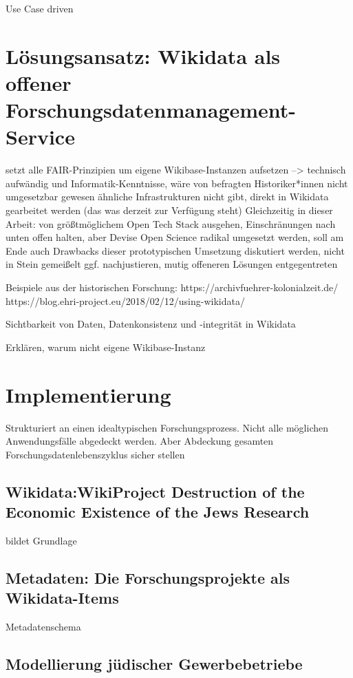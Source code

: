 \onehalfspacing

Use Case driven

\section{Lösungsansatz: Wikidata als offener Forschungsdatenmanagement-Service}

setzt alle FAIR-Prinzipien um
eigene Wikibase-Instanzen aufsetzen --> technisch aufwändig und Informatik-Kenntnisse, wäre von befragten Historiker*innen nicht umgesetzbar gewesen
ähnliche Infrastrukturen nicht gibt, direkt in Wikidata gearbeitet werden (das was derzeit zur Verfügung steht)
Gleichzeitig in dieser Arbeit: von größtmöglichem Open Tech Stack ausgehen, Einschränungen nach unten offen halten, aber Devise Open Science radikal umgesetzt werden, soll am Ende auch Drawbacks dieser prototypischen Umsetzung diskutiert werden, nicht in Stein gemeißelt ggf. nachjustieren, mutig offeneren Lösungen entgegentreten

Beispiele aus der historischen Forschung:
https://archivfuehrer-kolonialzeit.de/
https://blog.ehri-project.eu/2018/02/12/using-wikidata/


Sichtbarkeit von Daten, Datenkonsistenz und -integrität in Wikidata

Erklären, warum nicht eigene Wikibase-Instanz

\section{Implementierung}

Strukturiert an einen idealtypischen Forschungsprozess. Nicht alle möglichen Anwendungsfälle abgedeckt werden. Aber Abdeckung gesamten Forschungsdatenlebenszyklus sicher stellen

\subsection{Wikidata:WikiProject Destruction of the Economic Existence of the Jews Research}
bildet Grundlage

\subsection{Metadaten: Die Forschungsprojekte als Wikidata-Items}
Metadatenschema

\subsection{Modellierung jüdischer Gewerbebetriebe}

